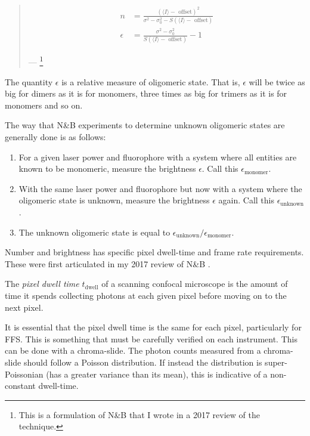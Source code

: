 \documentclass[12pt,]{book}
\providecommand{\tightlist}{%
  \setlength{\itemsep}{0pt}\setlength{\parskip}{0pt}}
\let\rmarkdownfootnote\footnote%
\def\footnote{\protect\rmarkdownfootnote}
\theoremstyle{definition}
\theoremstyle{definition}
\theoremstyle{definition}
\theoremstyle{remark}
\let\BeginKnitrBlock\begin \let\EndKnitrBlock\end
\begin{document}
\begin{quote}
\begin{align}
n &= \frac{(\langle I \rangle - \text{ offset})^2}{\sigma^2 - \sigma_0^2 - S(\langle I \rangle - \text{ offset})} \label{eq:NBa2-2} \\
\epsilon &= \frac{\sigma^2 - \sigma_0^2}{S(\langle I \rangle - \text{ offset})} - 1 \label{eq:NBa2-1}
\end{align}

--- \citet{NBreview}\footnote{This is a formulation of N\&B that I wrote
  in a 2017 review of the technique.}
\end{quote}

The quantity \(\epsilon\) is a relative measure of oligomeric state.
That is, \(\epsilon\) will be twice as big for dimers as it is for
monomers, three times as big for trimers as it is for monomers and so
on.

The way that N\&B experiments to determine unknown oligomeric states are
generally done is as follows:

\begin{enumerate}
\def\labelenumi{\arabic{enumi}.}
\tightlist
\item
  For a given laser power and fluorophore with a system where all
  entities are known to be monomeric, measure the brightness
  \(\epsilon\). Call this \(\epsilon_\text{monomer}\).
\item
  With the same laser power and fluorophore but now with a system where
  the oligomeric state is unknown, measure the brightness \(\epsilon\)
  again. Call this \(\epsilon_\text{unknown}\).
\item
  The unknown oligomeric state is equal to
  \(\epsilon_\text{unknown} / \epsilon_\text{monomer}\).
\end{enumerate}

Number and brightness has specific pixel dwell-time and frame rate
requirements. These were first articulated in my 2017 review of N\&B
\citep{NBreview}.

\BeginKnitrBlock{definition}
\protect\hypertarget{def:unnamed-chunk-15}{}{\label{def:unnamed-chunk-15}
}The \emph{pixel dwell time} \(t_\text{dwell}\) of a scanning confocal
microscope is the amount of time it spends collecting photons at each
given pixel before moving on to the next pixel.
\EndKnitrBlock{definition}

It is essential that the pixel dwell time is the same for each pixel,
particularly for FFS. This is something that must be carefully verified
on each instrument. This can be done with a chroma-slide. The photon
counts measured from a chroma-slide should follow a Poisson
distribution. If instead the distribution is super-Poissonian (has a
greater variance than its mean), this is indicative of a non-constant
dwell-time.
\end{document}
